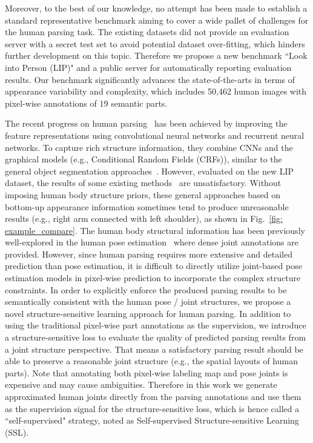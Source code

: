 \documentclass[10pt,twocolumn,letterpaper]{article}
\begin{document}
Moreover, to the best of our knowledge, no attempt has been made to establish a standard representative benchmark aiming to cover a wide pallet of challenges for the human parsing task. The existing datasets did not provide an evaluation server with a secret test set to avoid potential dataset over-fitting, which hinders further development on this topic. Therefore we propose a new benchmark ``Look into Person (LIP)" and a public server for automatically reporting evaluation results. Our benchmark significantly advances the state-of-the-arts in terms of appearance variability and complexity, which includes 50,462 human images with pixel-wise annotations of 19 semantic parts.

The recent progress on human parsing~\cite{chen2015attention,xia2015zoom,yamaguchi2012parsing,Yamaguchiparsing13,Dongparsing13,SimoSerraACCV2014,M-CNN,Co-CNN} has been achieved by improving the feature representations using convolutional neural networks and recurrent neural networks. To capture rich structure information, they combine CNNs and the graphical models (e.g., Conditional Random Fields (CRFs)), similar to the general object segmentation approaches~\cite{crfasrnn,chen2014semantic,wang2015joint}. However, evaluated on the new LIP dataset, the results of some existing methods~\cite{badrinarayanan2015segnet,long2014fully,chen2014semantic,chen2015attention} are unsatisfactory. Without imposing human body structure priors, these general approaches based on bottom-up appearance information sometimes tend to produce unreasonable results (e.g., right arm connected with left shoulder), as shown in Fig.~\ref{fig: example_compare}. The human body structural information has been previously well-explored in the human pose estimation~\cite{yang2016end,Chen_NIPS14} where dense joint annotations are provided. However, since human parsing requires more extensive and detailed prediction than pose estimation, it is difficult to directly utilize joint-based pose estimation models in pixel-wise prediction to incorporate the complex structure constraints. In order to explicitly enforce the produced parsing results to be semantically consistent with the human pose / joint structures, we propose a novel structure-sensitive learning approach for human parsing. In addition to using the traditional pixel-wise part annotations as the supervision, we introduce a structure-sensitive loss to evaluate the quality of predicted parsing results from a joint structure perspective. That means a satisfactory parsing result should be able to preserve a reasonable joint structure (e.g., the spatial layouts of human parts). Note that annotating both pixel-wise labeling map and pose joints is expensive and may cause ambiguities. Therefore in this work we generate approximated human joints directly from the parsing annotations and use them as the supervision signal for the structure-sensitive loss, which is hence called a  ``self-supervised" strategy, noted as Self-supervised Structure-sensitive Learning (SSL).
\end{document}
